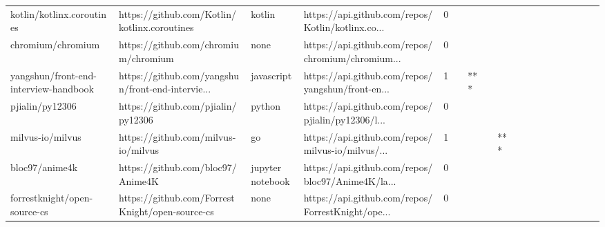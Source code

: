 \begin{tabular}{llllrlllllllllllll}
kotlin/kotlinx.coroutines                          &       https://github.com/Kotlin/kotlinx.coroutines &            kotlin &  https://api.github.com/repos/Kotlin/kotlinx.co... &       0 &         &        &           &                &                 &        &           &           &          &          &       &              &          \\
chromium/chromium                                  &               https://github.com/chromium/chromium &              none &  https://api.github.com/repos/chromium/chromium... &       0 &         &        &           &                &                 &        &           &           &          &          &       &              &          \\
yangshun/front-end-interview-handbook              &  https://github.com/yangshun/front-end-intervie... &        javascript &  https://api.github.com/repos/yangshun/front-en... &       1 &         &    *** &           &                &                 &        &           &           &          &          &       &              &          \\
pjialin/py12306                                    &                 https://github.com/pjialin/py12306 &            python &  https://api.github.com/repos/pjialin/py12306/l... &       0 &         &        &           &                &                 &        &           &           &          &          &       &              &          \\
milvus-io/milvus                                   &                https://github.com/milvus-io/milvus &                go &  https://api.github.com/repos/milvus-io/milvus/... &       1 &         &        &           &            *** &                 &        &           &           &          &          &       &              &          \\
bloc97/anime4k                                     &                  https://github.com/bloc97/Anime4K &  jupyter notebook &  https://api.github.com/repos/bloc97/Anime4K/la... &       0 &         &        &           &                &                 &        &           &           &          &          &       &              &          \\
forrestknight/open-source-cs                       &    https://github.com/ForrestKnight/open-source-cs &              none &  https://api.github.com/repos/ForrestKnight/ope... &       0 &         &        &           &                &                 &        &           &           &          &          &       &              &          \\

\end{tabular}
